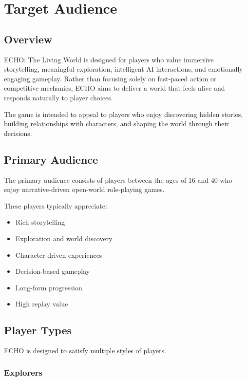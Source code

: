 \chapter{Target Audience}

\section{Overview}

ECHO: The Living World is designed for players who value immersive storytelling, meaningful exploration, intelligent AI interactions, and emotionally engaging gameplay. Rather than focusing solely on fast-paced action or competitive mechanics, ECHO aims to deliver a world that feels alive and responds naturally to player choices.

The game is intended to appeal to players who enjoy discovering hidden stories, building relationships with characters, and shaping the world through their decisions.

\section{Primary Audience}

The primary audience consists of players between the ages of 16 and 40 who enjoy narrative-driven open-world role-playing games.

These players typically appreciate:

\begin{itemize}
    \item Rich storytelling
    \item Exploration and world discovery
    \item Character-driven experiences
    \item Decision-based gameplay
    \item Long-form progression
    \item High replay value
\end{itemize}

\section{Player Types}

ECHO is designed to satisfy multiple styles of players.

\subsection{Explorers}


